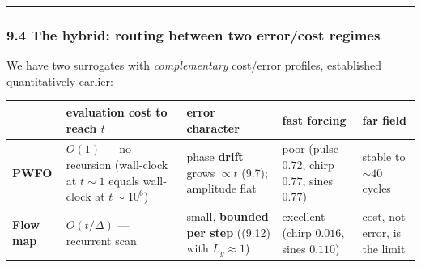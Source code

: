 \documentclass[
  11pt,
]{article}
\newcounter{none} %
\begin{document}
\begin{center}\rule{0.5\linewidth}{0.5pt}\end{center}

\subsubsection{9.4 The hybrid: routing between two error/cost
regimes}\label{the-hybrid-routing-between-two-errorcost-regimes}

We have two surrogates with \emph{complementary} cost/error profiles,
established quantitatively earlier:

{\def\LTcaptype{none} %
\begin{longtable}[]{@{}
  >{\raggedright\arraybackslash}p{}
  >{\raggedright\arraybackslash}p{}
  >{\raggedright\arraybackslash}p{}
  >{\raggedright\arraybackslash}p{}
  >{\raggedright\arraybackslash}p{}@{}}
\toprule\noalign{}
\begin{minipage}[b]{\linewidth}\raggedright
\end{minipage} & \begin{minipage}[b]{\linewidth}\raggedright
evaluation cost to reach \(t\)
\end{minipage} & \begin{minipage}[b]{\linewidth}\raggedright
error character
\end{minipage} & \begin{minipage}[b]{\linewidth}\raggedright
fast forcing
\end{minipage} & \begin{minipage}[b]{\linewidth}\raggedright
far field
\end{minipage} \\
\midrule\noalign{}
\endhead
\bottomrule\noalign{}
\endlastfoot
\textbf{PWFO} & \(O(1)\) --- no recursion (wall-clock at \(t\!\sim\!1\)
equals wall-clock at \(t\!\sim\!10^6\)) & phase \textbf{drift} grows
\(\propto t\) (9.7); amplitude flat & poor (pulse \(0.72\), chirp
\(0.77\), sines \(0.77\)) & stable to \(\sim40\) cycles \\
\textbf{Flow map} & \(O(t/\Delta)\) --- recurrent scan & small,
\textbf{bounded per step} ((9.12) with \(L_g\!\approx\!1\)) & excellent
(chirp \(0.016\), sines \(0.110\)) & cost, not error, is the limit \\
\end{longtable}
}
\end{document}
